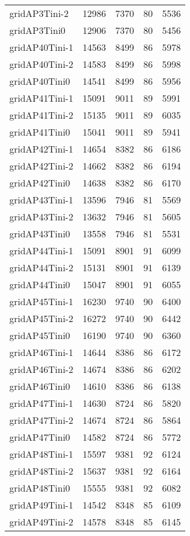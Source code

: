 \begin{longtable}{lrrrr}
gridAP3Tini-2 & 12986 & 7370 & 80 & 5536 \\
gridAP3Tini0 & 12906 & 7370 & 80 & 5456 \\
gridAP40Tini-1 & 14563 & 8499 & 86 & 5978 \\
gridAP40Tini-2 & 14583 & 8499 & 86 & 5998 \\
gridAP40Tini0 & 14541 & 8499 & 86 & 5956 \\
gridAP41Tini-1 & 15091 & 9011 & 89 & 5991 \\
gridAP41Tini-2 & 15135 & 9011 & 89 & 6035 \\
gridAP41Tini0 & 15041 & 9011 & 89 & 5941 \\
gridAP42Tini-1 & 14654 & 8382 & 86 & 6186 \\
gridAP42Tini-2 & 14662 & 8382 & 86 & 6194 \\
gridAP42Tini0 & 14638 & 8382 & 86 & 6170 \\
gridAP43Tini-1 & 13596 & 7946 & 81 & 5569 \\
gridAP43Tini-2 & 13632 & 7946 & 81 & 5605 \\
gridAP43Tini0 & 13558 & 7946 & 81 & 5531 \\
gridAP44Tini-1 & 15091 & 8901 & 91 & 6099 \\
gridAP44Tini-2 & 15131 & 8901 & 91 & 6139 \\
gridAP44Tini0 & 15047 & 8901 & 91 & 6055 \\
gridAP45Tini-1 & 16230 & 9740 & 90 & 6400 \\
gridAP45Tini-2 & 16272 & 9740 & 90 & 6442 \\
gridAP45Tini0 & 16190 & 9740 & 90 & 6360 \\
gridAP46Tini-1 & 14644 & 8386 & 86 & 6172 \\
gridAP46Tini-2 & 14674 & 8386 & 86 & 6202 \\
gridAP46Tini0 & 14610 & 8386 & 86 & 6138 \\
gridAP47Tini-1 & 14630 & 8724 & 86 & 5820 \\
gridAP47Tini-2 & 14674 & 8724 & 86 & 5864 \\
gridAP47Tini0 & 14582 & 8724 & 86 & 5772 \\
gridAP48Tini-1 & 15597 & 9381 & 92 & 6124 \\
gridAP48Tini-2 & 15637 & 9381 & 92 & 6164 \\
gridAP48Tini0 & 15555 & 9381 & 92 & 6082 \\
gridAP49Tini-1 & 14542 & 8348 & 85 & 6109 \\
gridAP49Tini-2 & 14578 & 8348 & 85 & 6145 \\

\end{longtable}
